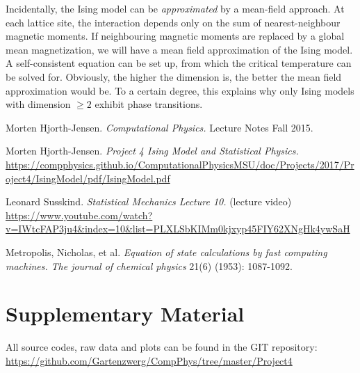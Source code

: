 \documentclass{article}
\begin{document}
Incidentally, the Ising model can be \emph{approximated} by a mean-field approach. At each lattice site, the interaction depends only on the sum of nearest-neighbour magnetic moments. If neighbouring magnetic moments are replaced by a global mean magnetization, we will have a mean field approximation of the Ising model. A self-consistent equation can be set up, from which the critical temperature can be solved for.\cite{video} Obviously, the higher the dimension is, the better the mean field approximation would be. To a certain degree, this explains why only Ising models with dimension $\ge 2$ exhibit phase transitions.

\begin{thebibliography}{1}

 Morten Hjorth-Jensen. {\em Computational Physics.} Lecture Notes Fall 2015.

 Morten Hjorth-Jensen. {\em Project 4 Ising Model and Statistical Physics.} \url{https://compphysics.github.io/ComputationalPhysicsMSU/doc/Projects/2017/Project4/IsingModel/pdf/IsingModel.pdf}

 Leonard Susskind. {\em Statistical Mechanics Lecture 10.} (lecture video) \url{https://www.youtube.com/watch?v=IWtcFAP3ju4&index=10&list=PLXLSbKIMm0kjxyp45FIY62XNgHk4ywSaH}

 Metropolis, Nicholas, et al. {\em Equation of state calculations by fast computing machines.} \textit{The journal of chemical physics} 21(6) (1953): 1087-1092.

\end{thebibliography}



\section*{Supplementary Material}   %
All source codes, raw data and plots can be found in the GIT repository: 
\url{https://github.com/Gartenzwerg/CompPhys/tree/master/Project4}
\end{document}
